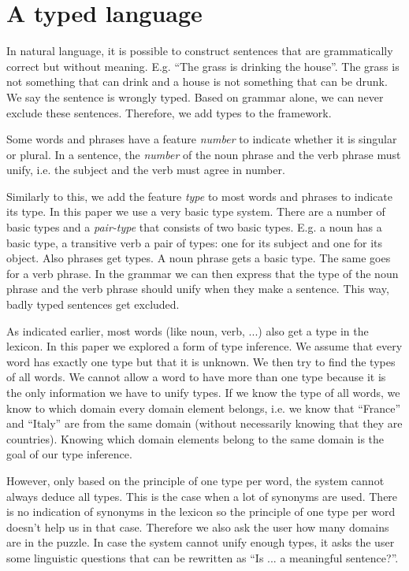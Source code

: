 \section{A typed language}
In natural language, it is possible to construct sentences that are grammatically correct but without meaning. E.g. ``The grass is drinking the house''. The grass is not something that can drink and a house is not something that can be drunk. We say the sentence is wrongly typed. Based on grammar alone, we can never exclude these sentences. Therefore, we add types to the framework.

Some words and phrases have a feature \textit{number} to indicate whether it is singular or plural. In a sentence, the \textit{number} of the noun phrase and the verb phrase must unify, i.e. the subject and the verb must agree in number.

Similarly to this, we add the feature \textit{type} to most words and phrases to indicate its type. In this paper we use a very basic type system. There are a number of basic types and a \textit{pair-type} that consists of two basic types. E.g. a noun has a basic type, a transitive verb a pair of types: one for its subject and one for its object. Also phrases get types. A noun phrase gets a basic type. The same goes for a verb phrase. In the grammar we can then express that the type of the noun phrase and the verb phrase should unify when they make a sentence. This way, badly typed sentences get excluded.

As indicated earlier, most words (like noun, verb, ...) also get a type in the lexicon. In this paper we explored a form of type inference. We assume that every word has exactly one type but that it is unknown. We then try to find the types of all words. We cannot allow a word to have more than one type because it is the only information we have to unify types. If we know the type of all words, we know to which domain every domain element belongs, i.e. we know that ``France'' and ``Italy'' are from the same domain (without necessarily knowing that they are countries). Knowing which domain elements belong to the same domain is the goal of our type inference.

However, only based on the principle of one type per word, the system cannot always deduce all types. This is the case when a lot of synonyms are used. There is no indication of synonyms in the lexicon so the principle of one type per word doesn't help us in that case. Therefore we also ask the user how many domains are in the puzzle. In case the system cannot unify enough types, it asks the user some linguistic questions that can be rewritten as ``Is ... a meaningful sentence?''.

